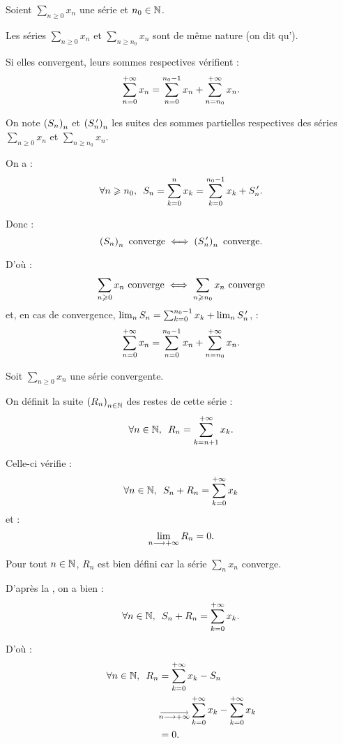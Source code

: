 \begin{rem}
Soient \(\sum_{n\geq0}x_n\) une série et \(n_0\in\mathbb{N}\).

Les séries \(\sum_{n\geq0}x_n\) et \(\sum_{n\geq n_0}x_n\) sont de même nature (on dit qu').

Si elles convergent, leurs sommes respectives vérifient : \[\sum_{n=0}^{+\infty}x_n=\sum_{n=0}^{n_0-1}x_n+\sum_{n=n_0}^{+\infty}x_n.\]
\end{rem}

\begin{dem}
On note \(\left(S_n\right)_n\) et \(\left(S_n^{\,\prime}\right)_n\) les suites des sommes partielles respectives des séries \(\sum_{n\geq0}x_n\) et \(\sum_{n\geq n_0}x_n\).

On a : \[\quantifs{\forall n\geq n_0}S_n=\sum_{k=0}^nx_k=\sum_{k=0}^{n_0-1}x_k+S_n\prim.\]

Donc : \[\left(S_n\right)_n\text{ converge}\iff\left(S_n^{\,\prime}\right)_n\text{ converge}.\]

D'où : \[\sum_{n\geqslant0}x_n\text{ converge}\iff\sum_{n\geqslant n_0}x_n\text{ converge}\] et, en cas de convergence, \(\lim_nS_n=\sum_{k=0}^{n_0-1}x_k+\lim_nS_n^{\,\prime}\), \cad : \[\sum_{n=0}^{+\infty}x_n=\sum_{n=0}^{n_0-1}x_n+\sum_{n=n_0}^{+\infty}x_n.\]
\end{dem}

\begin{defprop}
Soit \(\sum_{n\geq0}x_n\) une série convergente.

On définit la suite \(\left(R_n\right)_{n\in\mathbb{N}}\) des restes de cette série : \[\quantifs{\forall n\in\N}R_n=\sum_{k=n+1}^{\pinf}x_k.\]

Celle-ci vérifie : \[\quantifs{\forall n\in\N}S_n+R_n=\sum_{k=0}^{\pinf}x_k\] et : \[\lim_{n\longrightarrow+\infty}R_n=0.\]
\end{defprop}

\begin{dem}
Pour tout \(n\in\mathbb{N}\), \(R_n\) est bien défini car la série \(\sum_nx_n\) converge.

D'après la , on a bien : \[\quantifs{\forall n\in\N}S_n+R_n=\sum_{k=0}^{\pinf}x_k.\]

D'où : \[\begin{aligned}
\quantifs{\forall n\in\N}R_n&=\sum_{k=0}^{\pinf}x_k-S_n \\
&\tendqd{n\to\pinf}\sum_{k=0}^{\pinf}x_k-\sum_{k=0}^{\pinf}x_k \\
&=0.
\end{aligned}\]
\end{dem}

